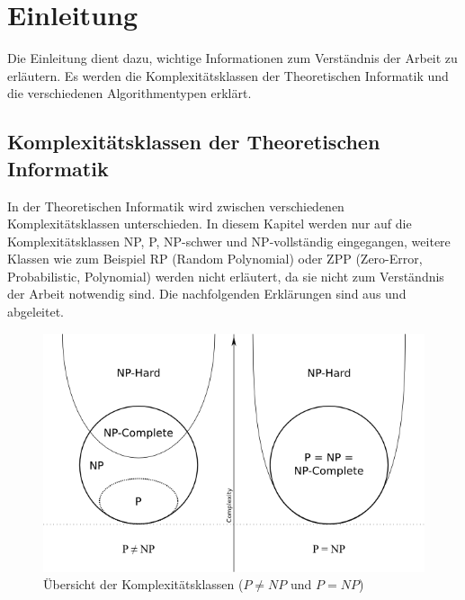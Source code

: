 %
%

\chapter{Einleitung}\label{chap.einleitung}
Die Einleitung dient dazu, wichtige Informationen zum Verständnis der Arbeit zu erläutern. Es werden die Komplexitätsklassen der Theoretischen Informatik und die verschiedenen Algorithmentypen erklärt.

\section{Komplexitätsklassen der Theoretischen Informatik}\label{cat_theo_inf}
In der Theoretischen Informatik wird zwischen verschiedenen Komplexitätsklassen unterschieden. In diesem Kapitel werden nur auf die Komplexitätsklassen NP, P, NP-schwer und NP-vollständig eingegangen, weitere Klassen wie zum Beispiel RP (Random Polynomial) oder ZPP (Zero-Error, Probabilistic, Polynomial) werden nicht erläutert, da sie nicht zum Verständnis der Arbeit notwendig sind. Die nachfolgenden Erklärungen sind aus \cite{hopcroft2011einfuehrung} und \cite{slides_p_np} abgeleitet.

\begin{figure}[h]
\includegraphics[scale=0.7]{images/einleitung/p_np_np-complete_np-hard.png}
\caption[Übersicht der Komplexitätsklassen ($P!=NP$ und $P=NP$)]{Übersicht der Komplexitätsklassen ($P \neq NP$ und $P=NP$) \cite{pic_p_np}}
\label{fig:complexity_overview}
\end{figure}

